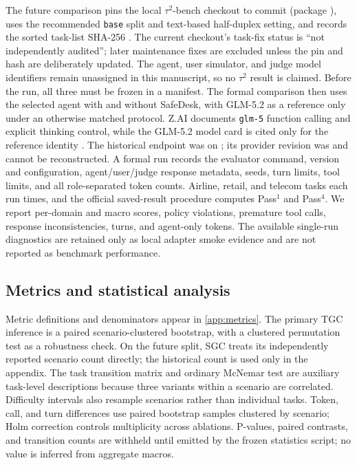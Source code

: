 \documentclass[10pt]{article}
\newcommand{\safedesk}{SafeDesk}
\newcommand{\code}[1]{\texttt{#1}}
\begin{document}
The future comparison pins the local $\tau^2$-bench checkout to commit
\TauBenchmarkRevision{} (package \TauPackageVersion{}), uses the recommended
\code{base} split and text-based half-duplex setting, and records the sorted
task-list SHA-256 \TauTaskListHash{}. The current checkout's task-fix status is
``not independently audited''; later maintenance fixes are excluded unless the
pin and hash are deliberately updated. The agent, user simulator, and judge model
identifiers remain unassigned in this manuscript, so no $\tau^2$ result is claimed.
Before the run, all three must be frozen in a manifest. The formal comparison then
uses the selected agent with and without \safedesk{}, with GLM-5.2 as a reference
only under an otherwise matched protocol.
Z.AI documents \texttt{glm-5} function calling and explicit thinking control, while
the GLM-5.2 model card is cited only for the reference identity
\citep{zai2026glm5,zai2026glm52,barres2025tau2,tau2benchsoftware2026}. The historical
endpoint was \TauAgentEndpoint{} on \TauModelAccessDate; its provider revision was
\TauProviderVersion and cannot be reconstructed. A formal run records the
evaluator command, version and configuration, agent/user/judge response metadata,
seeds, turn limits, tool limits, and all role-separated token counts. Airline,
retail, and telecom
tasks each run \TauTrialsPerTask{} times, and the official saved-result procedure
computes Pass$^1$ and Pass$^4$. We report per-domain and macro scores, policy
violations, premature tool calls, response inconsistencies, turns, and agent-only
tokens. The available single-run diagnostics are retained only as local adapter
smoke evidence and are not reported as benchmark performance.

\subsection{Metrics and statistical analysis}
\label{sec:metrics}

Metric definitions and denominators appear in \cref{app:metrics}. The primary TGC
inference is a paired scenario-clustered bootstrap, with a clustered permutation
test as a robustness check. On the future split, SGC treats its independently
reported scenario count directly; the historical \AWScenarioCount{} count is used
only in the appendix.
The task transition matrix and ordinary McNemar test are auxiliary task-level
descriptions because three variants within a scenario are correlated. Difficulty
intervals also resample scenarios rather than individual tasks. Token, call, and
turn differences use \AWBootstrapSamples{} paired bootstrap samples clustered by
scenario; Holm correction controls multiplicity across ablations. P-values,
paired contrasts, and transition counts are withheld until emitted by the frozen
statistics script; no value is inferred from aggregate macros.
\end{document}
